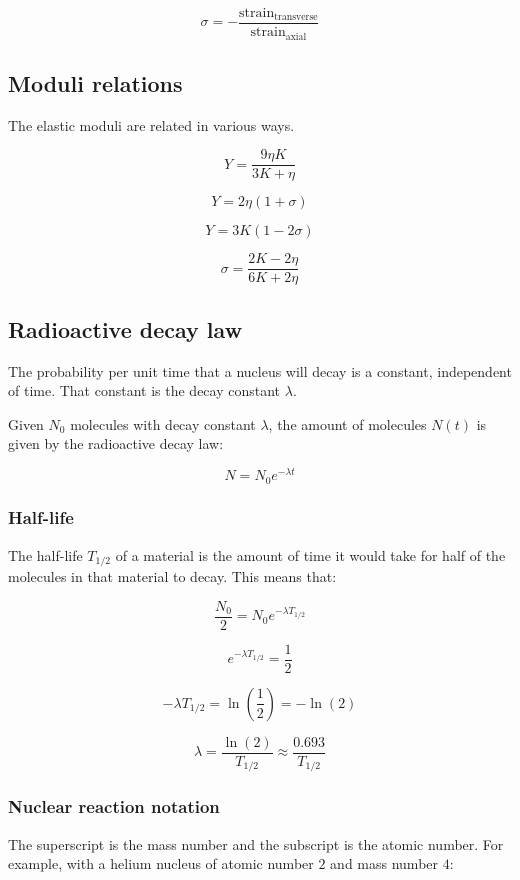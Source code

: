 \documentclass[12pt]{article}
\begin{document}
\[
\boxed{
\sigma = -\frac{\text{strain}_{\text{transverse}}}{\text{strain}_{\text{axial}}}
}
\]

\newpage

\subsection{Moduli relations}

The elastic moduli are related in various ways.

\[
\boxed{
Y = \frac{9 \eta K}{3K + \eta}
}
\]

\[
\boxed{
Y = 2 \eta (1 + \sigma)
}
\]

\[
\boxed{
Y = 3K(1 - 2\sigma)
}
\]

\[
\boxed{
\sigma = \frac{2K - 2\eta}{6K + 2\eta}
}
\]

\subsection{Radioactive decay law}

The probability per unit time that a nucleus will decay is a constant, independent of time.
That constant is the decay constant $\lambda$.

Given $N_0$ molecules with decay constant $\lambda$, the amount of molecules $N(t)$ is given by the radioactive decay law:

\[
\boxed{
N = N_0 e^{-\lambda t}
}
\]

\subsubsection{Half-life}

The half-life $T_{1/2}$ of a material is the amount of time it would take for half of the molecules in that material to decay.
This means that:

\[
\frac{N_0}{2} = N_0 e^{-\lambda T_{1/2}}
\]

\[
e^{-\lambda T_{1/2}} = \frac{1}{2}
\]

\[
-\lambda T_{1/2} = \ln\left(\frac{1}{2}\right) = -\ln\left(2\right)
\]

\[
\boxed{
\lambda = \frac{\ln(2)}{T_{1/2}} \approx \frac{0.693}{T_{1/2}}
}
\]

\subsubsection{Nuclear reaction notation}

The superscript is the mass number and the subscript is the atomic number.
For example, with a helium nucleus of atomic number $2$ and mass number $4$:
\end{document}
